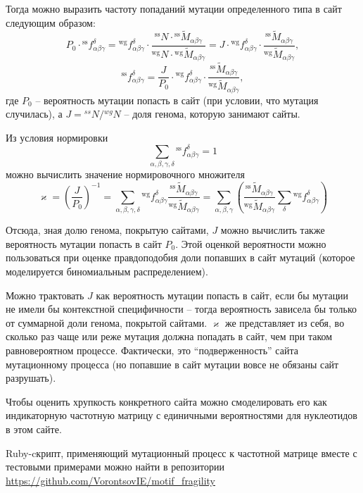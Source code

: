 \documentclass[a4paper]{article}
\begin{document}
Тогда можно выразить частоту попаданий мутации определенного типа в сайт следующим образом:
$$P_0\cdot{}^{\textrm{ss}}f_{\alpha\beta\gamma}^{\delta} = {}^{\textrm{wg}}f_{\alpha\beta\gamma}^{\delta} \cdot \frac{{}^{\textrm{ss}}N \cdot {}^{\textrm{ss}}\widetilde{M}_{\alpha\beta\gamma}}{{}^{\textrm{wg}}N \cdot {}^{\textrm{wg}}\widetilde{M}_{\alpha\beta\gamma}} = J\cdot{}^{\textrm{wg}}f_{\alpha\beta\gamma}^{\delta} \cdot\frac{{}^{\textrm{ss}}\widetilde{M}_{\alpha\beta\gamma}}{{}^{\textrm{wg}}\widetilde{M}_{\alpha\beta\gamma}},$$
$${}^{\textrm{ss}}f_{\alpha\beta\gamma}^{\delta} = \frac{J}{P_0}\cdot{}^{\textrm{wg}}f_{\alpha\beta\gamma}^{\delta} \cdot\frac{{}^{\textrm{ss}}\widetilde{M}_{\alpha\beta\gamma}}{{}^{\textrm{wg}}\widetilde{M}_{\alpha\beta\gamma}},$$
где $P_0$ -- вероятность мутации попасть в сайт (при условии, что мутация случилась), а $J={}^{ss}N / {}^{wg}N$ -- доля генома, которую занимают сайты.

Из условия нормировки
$$\sum_{\alpha,\beta,\gamma,\delta}{}^{\textrm{ss}}f_{\alpha\beta\gamma}^{\delta} = 1$$ можно вычислить значение нормировочного множителя
$$\varkappa = \left(\frac{J}{P_0}\right)^{-1} = \sum_{\alpha,\beta,\gamma,\delta}{}^{\textrm{wg}}f_{\alpha\beta\gamma}^{\delta} \frac{{}^{\textrm{ss}}\widetilde{M}_{\alpha\beta\gamma}}{{}^{\textrm{wg}}\widetilde{M}_{\alpha\beta\gamma}} = \sum_{\alpha,\beta,\gamma}\left(\frac{{}^{\textrm{ss}}\widetilde{M}_{\alpha\beta\gamma}}{{}^{\textrm{wg}}\widetilde{M}_{\alpha\beta\gamma}}\sum_{\delta}{}^{\textrm{wg}}f_{\alpha\beta\gamma}^{\delta}\right)$$

Отсюда, зная долю генома, покрытую сайтами, $J$ можно вычислить также вероятность мутации попасть в сайт $P_0$. Этой оценкой вероятности можно пользоваться при оценке правдоподобия доли попавших в сайт мутаций (которое моделируется биномиальным распределением).

Можно трактовать $J$ как вероятность мутации попасть в сайт, если бы мутации не имели бы контекстной специфичности -- тогда вероятность зависела бы только от суммарной доли генома, покрытой сайтами. $\varkappa$ же представляет из себя, во сколько раз чаще или реже мутация должна попадать в сайт, чем при таком равновероятном процессе. Фактически, это ``подверженность'' сайта мутационному процесса (но попавшие в сайт мутации вовсе не обязаны сайт разрушать).

Чтобы оценить хрупкость конкретного сайта можно смоделировать его как индикаторную частотную матрицу с единичными вероятностями для нуклеотидов в этом сайте.

Ruby-cкрипт, применяющий мутационный процесс к частотной матрице вместе с тестовыми примерами можно найти в репозитории \url{https://github.com/VorontsovIE/motif_fragility}
\end{document}
